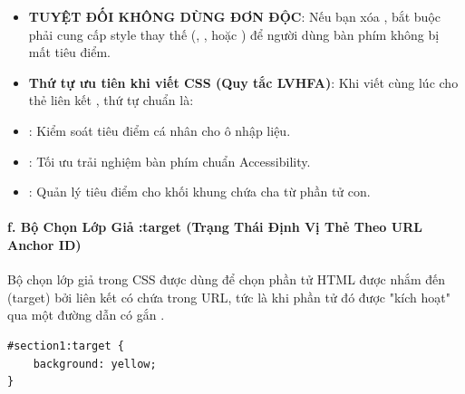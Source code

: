 \begin{warnBox}
\begin{itemize}[leftmargin=1.5em, itemsep=3pt, parsep=0pt]
    \item \textbf{TUYỆT ĐỐI KHÔNG DÙNG  ĐƠN ĐỘC}: Nếu bạn xóa , bắt buộc phải cung cấp style thay thế (, , hoặc ) để người dùng bàn phím không bị mất tiêu điểm.
    \item \textbf{Thứ tự ưu tiên khi viết CSS (Quy tắc LVHFA)}: Khi viết cùng lúc cho thẻ liên kết , thứ tự chuẩn là:
    \par\vspace{3pt}
\end{itemize}
\end{warnBox}

\begin{conceptBox}
\begin{itemize}[leftmargin=1.5em, itemsep=2pt, parsep=0pt]
    \item {}: Kiểm soát tiêu điểm cá nhân cho ô nhập liệu.
    \item {}: Tối ưu trải nghiệm bàn phím chuẩn Accessibility.
    \item {}: Quản lý tiêu điểm cho khối khung chứa cha từ phần tử con.
\end{itemize}
\end{conceptBox}

\paragraph{f. Bộ Chọn Lớp Giả :target (Trạng Thái Định Vị Thẻ Theo URL Anchor ID)}

Bộ chọn lớp giả  trong CSS được dùng để chọn phần tử HTML được nhắm đến (target) bởi liên kết có chứa  trong URL, tức là khi phần tử đó được "kích hoạt" qua một đường dẫn có gắn .

\begin{codeWindow}
\begin{lstlisting}[language=CSS3]
#section1:target {
    background: yellow;
}
\end{lstlisting}
\end{codeWindow}

